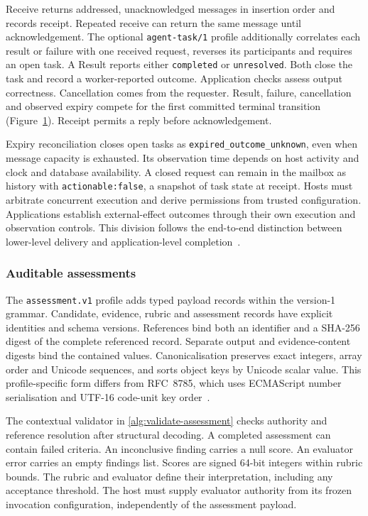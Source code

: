 \documentclass[preprint,12pt,a4paper]{elsarticle}
\newcommand{\code}[1]{\texttt{#1}}
\begin{document}
Receive returns addressed, unacknowledged messages in insertion order and records receipt. Repeated receive can return the same message until acknowledgement. The optional \code{agent-task/1} profile additionally correlates each result or failure with one received request, reverses its participants and requires an open task. A Result reports either \code{completed} or \code{unresolved}. Both close the task and record a worker-reported outcome. Application checks assess output correctness. Cancellation comes from the requester. Result, failure, cancellation and observed expiry compete for the first committed terminal transition (Figure~\ref{fig:states}). Receipt permits a reply before acknowledgement.

\begin{figure}[htbp]
\centering

\caption[Delivery and task transitions]{\protect}\label{fig:states}
\end{figure}

Expiry reconciliation closes open tasks as \code{expired\_outcome\_unknown}, even when message capacity is exhausted. Its observation time depends on host activity and clock and database availability. A closed request can remain in the mailbox as history with \code{actionable:false}, a snapshot of task state at receipt. Hosts must arbitrate concurrent execution and derive permissions from trusted configuration. Applications establish external-effect outcomes through their own execution and observation controls. This division follows the end-to-end distinction between lower-level delivery and application-level completion~\citep{saltzer1984}.

\subsubsection{Auditable assessments}
The \code{assessment.v1} profile adds typed payload records within the version-1 grammar. Candidate, evidence, rubric and assessment records have explicit identities and schema versions. References bind both an identifier and a SHA-256 digest of the complete referenced record. Separate output and evidence-content digests bind the contained values. Canonicalisation preserves exact integers, array order and Unicode sequences, and sorts object keys by Unicode scalar value. This profile-specific form differs from RFC~8785, which uses ECMAScript number serialisation and UTF-16 code-unit key order~\citep{rfc8785}.

The contextual validator in \autoref{alg:validate-assessment} checks authority and reference resolution after structural decoding. A completed assessment can contain failed criteria. An inconclusive finding carries a null score. An evaluator error carries an empty findings list. Scores are signed 64-bit integers within rubric bounds. The rubric and evaluator define their interpretation, including any acceptance threshold. The host must supply evaluator authority from its frozen invocation configuration, independently of the assessment payload.
\end{document}
